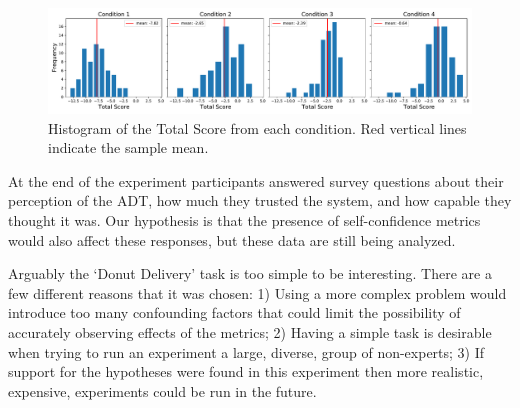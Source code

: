 \begin{figure}[tbp]
    \centering
    \includegraphics[width=1.0\linewidth]{Figures/total_score.pdf}
    \caption{Histogram of the Total Score from each condition. Red vertical lines indicate the sample mean.}
    \label{fig:total_score}
\end{figure}

At the end of the experiment participants answered survey questions about their perception of the ADT, how much they trusted the system, and how capable they thought it was. Our hypothesis is that the presence of self-confidence metrics would also affect these responses, but these data are still being analyzed.

Arguably the `Donut Delivery' task is too simple to be interesting. There are a few different reasons that it was chosen: 1) Using a more complex problem would introduce too many confounding factors that could limit the possibility of accurately observing effects of the \famsec{} metrics; 2) Having a simple task is desirable when trying to run an experiment a large, diverse, group of non-experts; 3) If support for the hypotheses were found in this experiment then more realistic, expensive, experiments could be run in the future.
